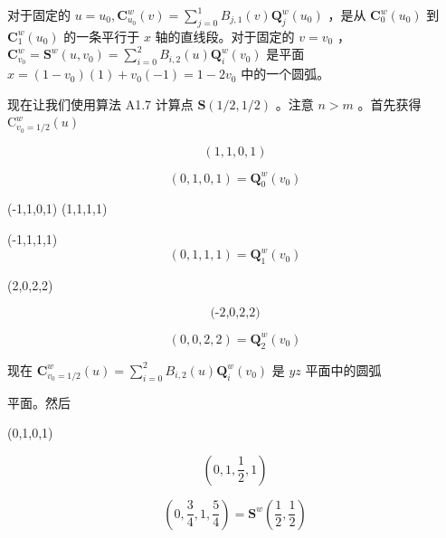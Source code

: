 \documentclass[../main.tex]{subfiles}
\begin{document}
\begin{minipage}{\linewidth}
对于固定的 \(u = {u}_{0},{\mathbf{C}}_{{u}_{0}}^{w}\left( v\right)  = \mathop{\sum }\limits_{{j = 0}}^{1}{B}_{j,1}\left( v\right) {\mathbf{Q}}_{j}^{w}\left( {u}_{0}\right)\) ，是从 \({\mathbf{C}}_{0}^{w}\left( {u}_{0}\right)\) 到 \({\mathbf{C}}_{1}^{w}\left( {u}_{0}\right)\) 的一条平行于 \(x\) 轴的直线段。对于固定的 \(v = {v}_{0}\) ， \({\mathbf{C}}_{{v}_{0}}^{w} = {\mathbf{S}}^{w}\left( {u,{v}_{0}}\right)  = \mathop{\sum }\limits_{{i = 0}}^{2}{B}_{i,2}\left( u\right) {\mathbf{Q}}_{i}^{w}\left( {v}_{0}\right)\) 是平面 \(x = \left( {1 - {v}_{0}}\right) \left( 1\right)  + {v}_{0}\left( {-1}\right)  = 1 - 2{v}_{0}\) 中的一个圆弧。
\begin{center}
\begin{minipage}{14cm}
\centering
{}
\captionsetup{font=small,skip=6pt,justification=centering}
\end{minipage}
\end{center}
\end{minipage}
\par\medskip

现在让我们使用算法 A1.7 计算点 \(\mathbf{S}\left( {1/2,1/2}\right)\) 。注意 \(n > m\) 。首先获得 \({\mathrm{C}}_{{v}_{0} = 1/2}^{w}\left( u\right)\)

\[
\left( {1,1,0,1}\right)
\]

\[
\left( {0,1,0,1}\right)  = {\mathbf{Q}}_{0}^{w}\left( {v}_{0}\right)
\]

(-1,1,0,1) (1,1,1,1)

(-1,1,1,1)
\[
\left( {0,1,1,1}\right)  = {\mathbf{Q}}_{1}^{w}\left( {v}_{0}\right)
\]

(2,0,2,2)

\[
\text{ (-2,0,2,2) }
\]

\[
\left( {0,0,2,2}\right)  = {\mathbf{Q}}_{2}^{w}\left( {v}_{0}\right)
\]


现在 \({\mathbf{C}}_{{v}_{0} = 1/2}^{w}\left( u\right)  = \mathop{\sum }\limits_{{i = 0}}^{2}{B}_{i,2}\left( u\right) {\mathbf{Q}}_{i}^{w}\left( {v}_{0}\right)\) 是 \({yz}\) 平面中的圆弧

平面。然后

(0,1,0,1)

\[
\left( {0,1,\frac{1}{2},1}\right)
\]

\[
\left( {0,\frac{3}{4},1,\frac{5}{4}}\right)  = {\mathbf{S}}^{w}\left( {\frac{1}{2},\frac{1}{2}}\right)
\]
\end{document}
